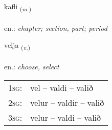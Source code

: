 \documentclass[frontgrid, backgrid]{flacards}\usepackage[]{graphicx}\usepackage[]{xcolor}
\begin{document}
\renewcommand{\blhead}{\vskip5pt {\small\bfseries\footnotesize Nafnorð | Noun }}
\renewcommand{\bcfoot}{\vskip5pt \hspace{2pt}{\small\bfseries\footnotesize 1K}}


{kafli \small{\textsubscript{(\textit{m.})}} \\[1ex] %
\textphonetic{[kʰaplɪ]} \\
en.: \emph{chapter; section, part; period} \\  [2ex]
\renewcommand*{\arraystretch}{0.8}
}

\renewcommand{\flhead}{\vskip5pt \fboxsep=0pt {\small\bfseries\footnotesize Sagnorð | Verb}}
\renewcommand{\fcfoot}{\vskip5pt \fboxsep=0pt \hspace{2pt}{\small\bfseries\footnotesize 1K}}

\renewcommand{\blhead}{\vskip5pt {\small\bfseries\footnotesize Sagnorð | Verb }}
\renewcommand{\bcfoot}{\vskip5pt \hspace{2pt}{\small\bfseries\footnotesize 1K}}


{velja \small{\textsubscript{(\textit{v.})}} \\[1ex] %
\textphonetic{[vɛlja]} \\
en.: \emph{choose, select} \\  [2ex]
\renewcommand*{\arraystretch}{0.8}
\begin{tabular}{p{1cm}l}
\textsc{1sg}: & vel -- valdi -- valið \\ 
\textsc{2sg}: & velur -- valdir -- valið \\ 
\textsc{3sg}: & velur -- valdi -- valið \\ 
\end{tabular}
}

\renewcommand{\flhead}{\vskip5pt \fboxsep=0pt {\small\bfseries\footnotesize Nafnorð | Noun}}
\renewcommand{\fcfoot}{\vskip5pt \fboxsep=0pt \hspace{2pt}{\small\bfseries\footnotesize 1K}}
\end{document}
